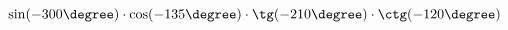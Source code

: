 \begin{ex}[type=calculate]
	\begin{condition}
		\( \sin(-300\degree)\cdot\cos(-135\degree)\cdot\tg(-210\degree)\cdot\ctg(-120\degree) \)
	\end{condition}
\end{ex}
